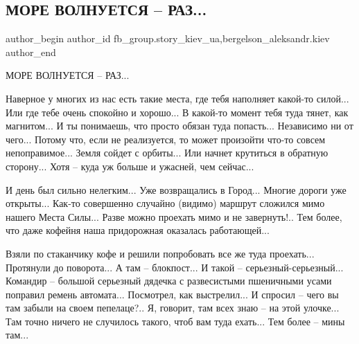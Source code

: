  
 
 
 
 
 
\subsection{МОРЕ ВОЛНУЕТСЯ – РАЗ...}
\label{sec:21_04_2022.fb.fb_group.story_kiev_ua.1.more_volnuetsja_raz}
 
\ifcmt
 author_begin
   author_id fb_group.story_kiev_ua,bergelson_aleksandr.kiev
 author_end
\fi

МОРЕ ВОЛНУЕТСЯ – РАЗ...

Наверное у многих из нас есть такие места, где тебя наполняет какой-то
силой... Или где тебе очень спокойно и хорошо... В какой-то момент тебя туда
тянет, как магнитом... И ты понимаешь, что просто обязан туда попасть...
Независимо ни от чего... Потому что, если не реализуется, то может произойти
что-то совсем непоправимое... Земля сойдет с орбиты... Или начнет крутиться в
обратную сторону... Хотя – куда уж больше и ужасней, чем сейчас...

И день был сильно нелегким... Уже возвращались в Город... Многие дороги уже
открыты... Как-то совершенно случайно (видимо) маршрут сложился мимо нашего
Места Силы... Разве можно проехать мимо и не завернуть!.. Тем более, что даже
кофейня наша придорожная оказалась работающей...


Взяли по стаканчику кофе и решили попробовать все же туда проехать...
Протянули до поворота... А там – блокпост... И такой – серьезный-серьезный...
Командир – большой серьезный дядечка с развесистыми пшеничными усами
поправил ремень автомата... Посмотрел, как выстрелил... И спросил – чего вы там
забыли на своем пепелаце?.. Я, говорит, там всех знаю – на этой улочке... Там
точно ничего не случилось такого, чтоб вам туда ехать... Тем более – мины там...


